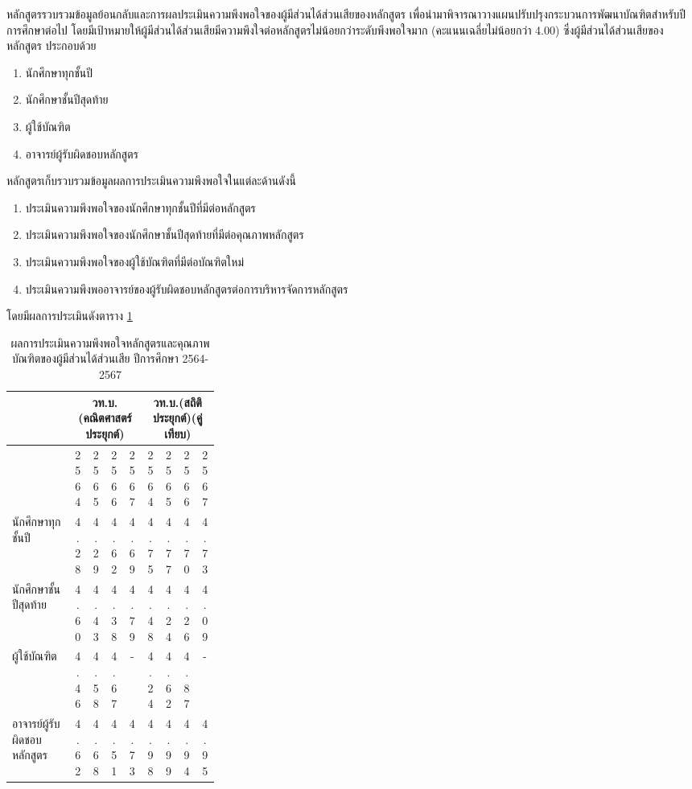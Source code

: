 
หลักสูตรรวบรวมข้อมูลย้อนกลับและการผลประเมินความพึงพอใจของผู้มีส่วนได้ส่วนเสียของหลักสูตร เพื่อนำมาพิจารณาวางแผนปรับปรุงกระบวนการพัฒนาบัณฑิตสำหรับปีการศึกษาต่อไป โดยมีเป้าหมายให้ผู้มีส่วนได้ส่วนเสียมีความพึงใจต่อหลักสูตรไม่น้อยกว่าระดับพึงพอใจมาก (คะแนนเฉลี่ยไม่น้อยกว่า 4.00) ซึ่งผู้มีส่วนได้ส่วนเสียของหลักสูตร ประกอบด้วย
\begin{enumerate}
	\item นักศึกษาทุกชั้นปี
	\item นักศึกษาชั้นปีสุดท้าย
	\item ผู้ใช้บัณฑิต
	\item อาจารย์ผู้รับผิดชอบหลักสูตร
\end{enumerate}
หลักสูตรเก็บรวบรวมข้อมูลผลการประเมินความพึงพอใจในแต่ละด้านดังนี้
\begin{enumerate}
	\item ประเมินความพึงพอใจของนักศึกษาทุกชั้นปีที่มีต่อหลักสูตร
	\item ประเมินความพึงพอใจของนักศึกษาชั้นปีสุดท้ายที่มีต่อคุณภาพหลักสูตร
	\item ประเมินความพึงพอใจของผู้ใช้บัณฑิตที่มีต่อบัณฑิตใหม่
	\item ประเมินความพึงพออาจารย์ของผู้รับผิดชอบหลักสูตรต่อการบริหารจัดการหลักสูตร
\end{enumerate}
โดยมีผลการประเมินดังตาราง \ref{Table:8.5-1}
\begin{longtable}{|>{\centering\arraybackslash}p{0.3\linewidth}|*{8}{c|}} 
\caption{ผลการประเมินความพึงพอใจหลักสูตรและคุณภาพบัณฑิตของผู้มีส่วนได้ส่วนเสีย ปีการศึกษา 2564-2567}	
	\label{Table:8.5-1}\\
	\hline
\multicolumn{1}{|>{\centering\arraybackslash}p{0.3\linewidth}|}{\textbf{การประเมินความพึงพอใจของผู้มีส่วนได้ส่วนเสีย}} &
	\multicolumn{4}{c|}{\textbf{วท.บ.(คณิตศาสตร์ประยุกต์)}} &
	\multicolumn{4}{c|}{\textbf{วท.บ.(สถิติประยุกต์)(คู่เทียบ)}} \\
	\cline{2-9}
	\multicolumn{1}{|c|}{} &
	\multicolumn{1}{c|}{2564} &
	\multicolumn{1}{c|}{2565} &
	\multicolumn{1}{c|}{2566} &
	\multicolumn{1}{c|}{2567} &
	\multicolumn{1}{c|}{2564} &
	\multicolumn{1}{c|}{2565} &
	\multicolumn{1}{c|}{2566} &
	\multicolumn{1}{c|}{2567} \\
	\hline
	\endhead
	
	นักศึกษาทุกชั้นปี & 4.28 & 4.29 & 4.62 & 4.69 & 4.75 & 4.77 & 4.70 & 4.73 \\
	\hline
	นักศึกษาชั้นปีสุดท้าย & 4.60 & 4.43 & 4.38 & 4.79 & 4.48 & 4.24 & 4.26 & 4.09 \\
	\hline
	ผู้ใช้บัณฑิต & 4.46 & 4.58 & 4.67 & - & 4.24 & 4.62 & 4.87 & - \\
	\hline
	อาจารย์ผู้รับผิดชอบหลักสูตร & 4.62 & 4.68 & 4.51 & 4.73 & 4.98 & 4.99 & 4.94 & 4.95 \\
	\hline

\end{longtable}




